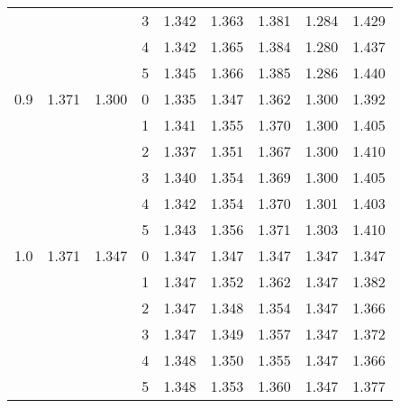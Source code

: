 \begin{tabular}{llllrrrrr}
    &       &       & 3 &  1.342 &  1.363 &  1.381 &  1.284 &  1.429 \\
    &       &       & 4 &  1.342 &  1.365 &  1.384 &  1.280 &  1.437 \\
    &       &       & 5 &  1.345 &  1.366 &  1.385 &  1.286 &  1.440 \\
0.9 & 1.371 & 1.300 & 0 &  1.335 &  1.347 &  1.362 &  1.300 &  1.392 \\
    &       &       & 1 &  1.341 &  1.355 &  1.370 &  1.300 &  1.405 \\
    &       &       & 2 &  1.337 &  1.351 &  1.367 &  1.300 &  1.410 \\
    &       &       & 3 &  1.340 &  1.354 &  1.369 &  1.300 &  1.405 \\
    &       &       & 4 &  1.342 &  1.354 &  1.370 &  1.301 &  1.403 \\
    &       &       & 5 &  1.343 &  1.356 &  1.371 &  1.303 &  1.410 \\
1.0 & 1.371 & 1.347 & 0 &  1.347 &  1.347 &  1.347 &  1.347 &  1.347 \\
    &       &       & 1 &  1.347 &  1.352 &  1.362 &  1.347 &  1.382 \\
    &       &       & 2 &  1.347 &  1.348 &  1.354 &  1.347 &  1.366 \\
    &       &       & 3 &  1.347 &  1.349 &  1.357 &  1.347 &  1.372 \\
    &       &       & 4 &  1.348 &  1.350 &  1.355 &  1.347 &  1.366 \\
    &       &       & 5 &  1.348 &  1.353 &  1.360 &  1.347 &  1.377 \\
\bottomrule
\end{tabular}
